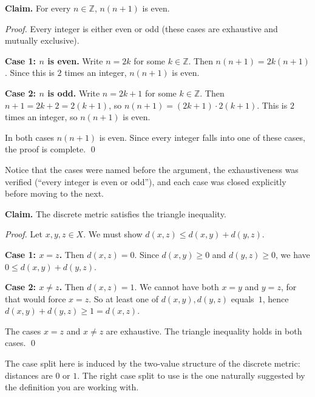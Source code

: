 \begin{example}[Parity of $n(n+1)$]
\textbf{Claim.} For every $n \in \mathbb{Z}$, $n(n+1)$ is even.

\medskip
\noindent\textit{Proof.}
Every integer is either even or odd (these cases are exhaustive and
mutually exclusive).

\textbf{Case 1: $n$ is even.}
Write $n = 2k$ for some $k \in \mathbb{Z}$.
Then $n(n+1) = 2k(n+1)$. Since this is $2$ times an integer,
$n(n+1)$ is even.

\textbf{Case 2: $n$ is odd.}
Write $n = 2k+1$ for some $k \in \mathbb{Z}$.
Then $n+1 = 2k+2 = 2(k+1)$, so $n(n+1) = (2k+1) \cdot 2(k+1)$.
This is $2$ times an integer, so $n(n+1)$ is even.

In both cases $n(n+1)$ is even. Since every integer falls into one of
these cases, the proof is complete. \qed

\medskip
\noindent
Notice that the cases were named before the argument, the exhaustiveness
was verified (``every integer is even or odd''), and each case was
closed explicitly before moving to the next.
\end{example}

\begin{example}
\textbf{Claim.} The discrete metric satisfies the triangle inequality.

\medskip
\noindent\textit{Proof.}
Let $x, y, z \in X$. We must show $d(x,z) \leq d(x,y) + d(y,z)$.

\textbf{Case 1: $x = z$.}
Then $d(x,z) = 0$. Since $d(x,y) \geq 0$ and $d(y,z) \geq 0$,
we have $0 \leq d(x,y) + d(y,z)$.

\textbf{Case 2: $x \neq z$.}
Then $d(x,z) = 1$. We cannot have both $x = y$ and $y = z$,
for that would force $x = z$. So at least one of $d(x,y), d(y,z)$
equals~$1$, hence $d(x,y) + d(y,z) \geq 1 = d(x,z)$.

The cases $x = z$ and $x \neq z$ are exhaustive. The triangle
inequality holds in both cases. \qed

\medskip
\noindent
The case split here is induced by the two-value structure of the
discrete metric: distances are $0$ or $1$. The right case split
to use is the one naturally suggested by the definition you are working with.
\end{example}
